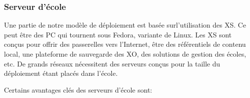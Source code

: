 \documentclass[12pt]{article}
\begin{document}
\subsubsection{Serveur d'école}
\label{sec-9-4-3}



Une partie de notre modèle de déploiement est basée surl'utilisation des
XS. Ce peut être des PC  qui tournent sous Fedora, variante de Linux. Les
XS sont conçus pour offrir des passerelles vers l'Internet, être des
référentiels de contenu local, une plateforme de sauvegarde des XO, des
solutions de gestion des écoles, etc. De grands réseaux nécessitent des
serveurs conçus pour la taille du déploiement étant placés dans l'école.


Certains avantages clés des serveurs d'école sont:
\end{document}
